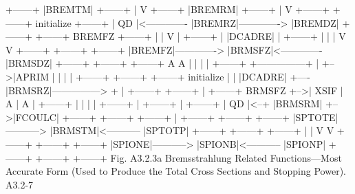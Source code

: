 \begin{center}
\begin{boxedverbatim}
                        +------+
                        |BREMTM|
                        +------+
                            |
                            V
                        +------+
                        |BREMRM|
                        +------+
                            |
                            V
 +------+               +------+  initialize   +------+
 |  QD  |<------------- |BREMRZ|-------------> |BREMDZ|
 +------+               +------+    BREMFZ     +------+
    |                                              |
    V                                              |
 +------+                                          |
 |DCADRE|                                          |
 +------+                                          |
    |                                              |
    V                                              V
 +------+               +------+               +------+
 |BREMFZ|-------------> |BRMSFZ|<------------- |BRMSDZ|
 +------+               +------+               +------+
                            A                    A |
                            |                    | |   +------+
            +---------------+                    | +-->|APRIM |
            |                                    | |   +------+
        +------+        +------+   initialize    | |
        |DCADRE|   +----|BRMSRZ|---------------> + |   +------+
        +------+   |    +------+     BRMSFZ        +-->| XSIF |
            A      |        A                      |   +------+
            |      |        |                      |
        +------+   |    +------+                   |   +------+
        |  QD  |<--+    |BRMSRM|                   +-->|FCOULC|
        +------+        +------+                       +------+
                            |
   +------+             +------+             +------+
   |SPTOTE|-----------> |BRMSTM|<----------- |SPTOTP|
   +------+             +------+             +------+
      |                                          |
      V                                          V
   +------+             +------+             +------+
   |SPIONE|-----------> |SPIONB|<----------- |SPIONP|
   +------+             +------+             +------+
Fig. A3.2.3a  Bremsstrahlung Related Functions---Most Accurate Form
   (Used to Produce the Total Cross Sections and Stopping Power).
 A3.2-7
\end{boxedverbatim}
\end{center}
\newpage {}
